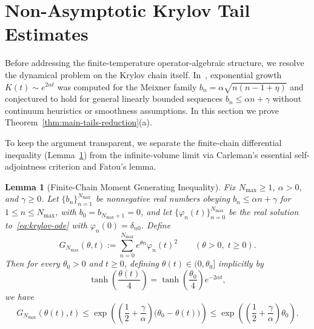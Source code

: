 \documentclass[11pt,a4paper]{article}
\numberwithin{equation}{section}
\theoremstyle{plain}
\newtheorem{lemma}[theorem]{Lemma}
\theoremstyle{definition}
\begin{document}
\section{Non-Asymptotic Krylov Tail Estimates}\label{sec:tails}

Before addressing the finite-temperature operator-algebraic structure, we resolve the dynamical problem on the Krylov chain itself. In~\cite[Sec.~V.1]{Parker2019}, exponential growth $K(t) \sim e^{2\alpha t}$ was computed for the Meixner family $b_n = \alpha\sqrt{n(n-1+\eta)}$ and conjectured to hold for general linearly bounded sequences $b_n \le \alpha n + \gamma$ without continuum heuristics or smoothness assumptions. In this section we prove Theorem~\ref{thm:main-tails-reduction}(a).

To keep the argument transparent, we separate the finite-chain differential inequality (Lemma~\ref{lem:char-finite}) from the infinite-volume limit via Carleman's essential self-adjointness criterion and Fatou's lemma.

\begin{lemma}[Finite-Chain Moment Generating Inequality]\label{lem:char-finite}
Fix $N_{\max}\ge 1$, $\alpha > 0$, and $\gamma \ge 0$. Let $\{b_n\}_{n=1}^{N_{\max}}$ be nonnegative real numbers obeying $b_n \le \alpha n + \gamma$ for $1\le n\le N_{\max}$, with $b_0 = b_{N_{\max}+1} = 0$, and let $\{\varphi_n(t)\}_{n=0}^{N_{\max}}$ be the real solution to~\eqref{eq:krylov-ode} with $\varphi_n(0)=\delta_{n0}$. Define
\[
  G_{N_{\max}}(\theta,t) := \sum_{n=0}^{N_{\max}} e^{\theta n}\varphi_n(t)^2 \qquad (\theta > 0,\; t\ge 0).
\]
Then for every $\theta_0 > 0$ and $t\ge 0$, defining $\theta(t)\in(0,\theta_0]$ implicitly by
\begin{equation}\label{eq:char-curve}
  \tanh\!\left(\frac{\theta(t)}{4}\right) = \tanh\!\left(\frac{\theta_0}{4}\right) e^{-2\alpha t},
\end{equation}
we have
\begin{equation}\label{eq:mgf-finite}
  G_{N_{\max}}(\theta(t), t) \le \exp\!\left(\left(\frac{1}{2}+\frac{\gamma}{\alpha}\right)\bigl(\theta_0-\theta(t)\bigr)\right) \le \exp\!\left(\left(\frac{1}{2}+\frac{\gamma}{\alpha}\right)\theta_0\right).
\end{equation}
\end{lemma}
\end{document}
